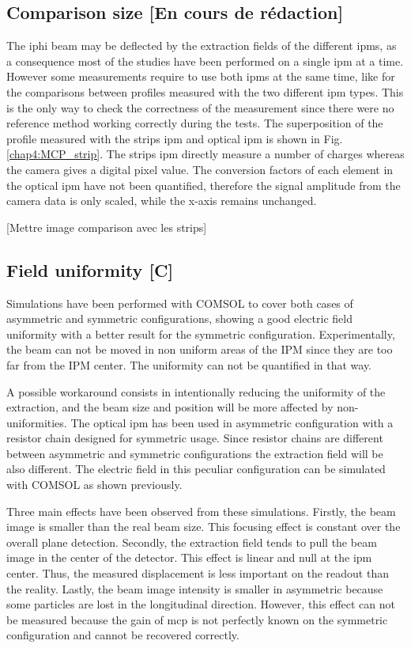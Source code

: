 \begin{refsection}
  \subsection{Comparison size [En cours de rédaction]}
  The \acrshort{iphi} beam may be deflected by the extraction fields of the different \acrshort{ipm}s, as a consequence most of the studies have been performed on a single \acrshort{ipm} at a time. However some measurements require to use both \acrshort{ipm}s at the same time, like for the comparisons between profiles measured with the two different \acrshort{ipm} types. This is the only way to check the correctness of the measurement since there were no reference method working correctly during the tests.
  The superposition of the profile measured with the strips \acrshort{ipm} and optical \acrshort{ipm} is shown in Fig. \ref{chap4:MCP_strip}. The strips \acrshort{ipm} directly measure a number of charges whereas the camera gives a digital pixel value. The conversion factors of each element in the optical \acrshort{ipm} have not been quantified, therefore the signal amplitude from the camera data is only scaled, while the x-axis remains unchanged.

  [Mettre image comparison avec les strips]
  

  \subsection{Field uniformity [C]}
  \label{chap4:sec:field_uniformity}
  Simulations have been performed with COMSOL to cover both cases of asymmetric and symmetric configurations, showing a good electric field uniformity with a better result for the symmetric configuration. Experimentally, the beam can not be moved in non uniform areas of the IPM since they are too far from the IPM center. The uniformity can not be quantified in that way.

  A possible workaround consists in intentionally reducing the uniformity of the extraction, and the beam size and position will be more affected by non-uniformities. The optical \acrshort{ipm} has been used in asymmetric configuration with a resistor chain designed for symmetric usage. Since resistor chains are different between asymmetric and symmetric configurations the extraction field will be also different. The electric field in this peculiar configuration can be simulated with COMSOL as shown previously.

  Three main effects have been observed from these simulations. Firstly, the beam image is smaller than the real beam size. This focusing effect is constant over the overall plane detection. Secondly, the extraction field tends to pull the beam image in the center of the detector. This effect is linear and null at the \acrshort{ipm} center. Thus, the measured displacement is less important on the readout than the reality. Lastly, the beam image intensity is smaller in asymmetric because some particles are lost in the longitudinal direction. However, this effect can not be measured because the gain of \acrshort{mcp} is not perfectly known on the symmetric configuration and cannot be recovered correctly.


\end{refsection}
